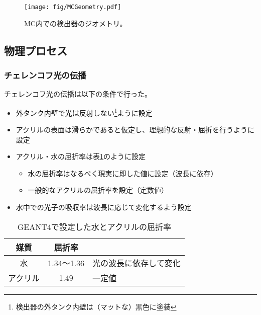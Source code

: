 \documentclass[11pt]{ltjsreport}
\newcommand{\tabref}[1]{表\ref{#1}}
\newcommand{\red}[1]{\textcolor{red}{\textbf{#1}}}
\newcommand{\comment}[1]{\red{#1}\footnote{\red{#1}}}
\begin{document}
\begin{figure}[htbp]
\centering
\texttt{[image: fig/MCGeometry.pdf]}
\caption[MC内での検出器のジオメトリ]{MC内での検出器のジオメトリ。}
\label{MCGeometry}
\end{figure}

\subsection{物理プロセス}

\subsubsection{チェレンコフ光の伝播}
チェレンコフ光の伝播は以下の条件で行った。

\begin{itemize}
\item 外タンク内壁で光は反射しない\footnote{検出器の外タンク内壁は（マットな）黒色に塗装}ように設定
\item アクリルの表面は滑らかであると仮定し、理想的な反射・屈折を行うように設定
\item アクリル・水の屈折率は\tabref{RefractiveIndex}のように設定
	\begin{itemize}
	\item 水の屈折率はなるべく現実に即した値に設定（波長に依存）
	\item 一般的なアクリルの屈折率を設定（定数値）
	\end{itemize}
\item 水中での光子の吸収率は波長に応じて変化するよう設定
\end{itemize}


\begin{table}[htbp]
\caption[GEANT4で設定した水とアクリルの屈折率]{GEANT4で設定した水とアクリルの屈折率}
\begin{center}
\begin{tabular}{ccl}
\hline \hline
媒質 & 屈折率 & \\
\hline
水 & 1.34〜1.36 & 光の波長に依存して変化\\%
アクリル & 1.49 & 一定値\\
\hline \hline
\end{tabular}
\end{center}
\label{RefractiveIndex}
\end{table}%
\end{document}
